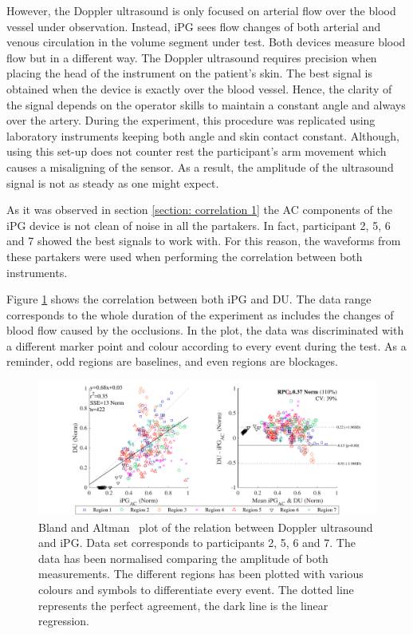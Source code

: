 However, the Doppler ultrasound is only focused on arterial flow over the blood vessel under observation. Instead, iPG sees flow changes of both arterial and venous circulation in the volume segment under test. Both devices measure blood flow but in a different way. The Doppler ultrasound requires precision when placing the head of the instrument on the patient's skin. The best signal is obtained when the device is exactly over the blood vessel. Hence, the clarity of the signal depends on the operator skills to maintain a constant angle and always over the artery. During the experiment, this procedure was replicated using laboratory instruments keeping both angle and skin contact constant. Although, using this set-up does not counter rest the participant's arm movement which causes a misaligning of the sensor. As a result, the amplitude of the ultrasound signal is not as steady as one might expect. 

As it was observed in section \ref{section: correlation 1} the AC components of the iPG device is not clean of noise in all the partakers. In fact, participant 2, 5, 6 and 7 showed the best signals to work with. For this reason, the waveforms from these partakers were used when performing the correlation between both instruments. 

Figure \ref{fig:corr FWUS} shows the correlation between both iPG and DU. The data range corresponds to the whole duration of the experiment as includes the changes of blood flow caused by the occlusions. In the plot, the data was discriminated with a different marker point and colour according to every event during the test. As a reminder, odd regions are baselines, and even regions are blockages.  

\begin{figure}[!htpb]
	\includegraphics[width=1\textwidth,keepaspectratio]{figure2}    
	\caption[Bland and Altman plot of the relation between Doppler ultrasound and iPG]{Bland and Altman~\cite{bland1986statistical} plot of the relation between Doppler ultrasound and iPG. Data set corresponds to participants 2, 5, 6 and 7.  The data has been normalised comparing the amplitude of both measurements. The different regions has been plotted with various colours and symbols to differentiate every event. The dotted line represents the perfect agreement, the dark line is the linear regression.}
	\label{fig:corr FWUS}
\end{figure}

